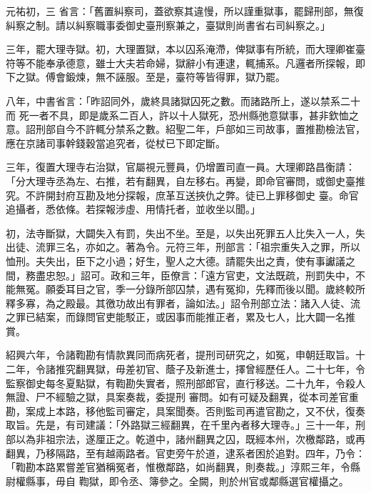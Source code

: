 \begin{pinyinscope}
 元祐初，三
 省言：「舊置糾察司，蓋欲察其違慢，所以謹重獄事，罷歸刑部，無復糾察之制。請以糾察職事委御史臺刑察兼之，臺獄則尚書省右司糾察之。」



 三年，罷大理寺獄。初，大理置獄，本以囚系淹滯，俾獄事有所統，而大理卿崔臺符等不能奉承德意，雖士大夫若命婦，獄辭小有連逮，輒捕系。凡邏者所探報，即下之獄。傅會鍛煉，無不誣服。至是，臺符等皆得罪，獄乃罷。



 八年，中書省言：「昨詔同外，歲終具諸獄囚死之數。而諸路所上，遂以禁系二十而
 死一者不具，即是歲系二百人，許以十人獄死，恐州縣弛意獄事，甚非欽恤之意。詔刑部自今不許輒分禁系之數。紹聖二年，戶部如三司故事，置推勘檢法官，應在京諸司事幹錢穀當追究者，從杖已下即定斷。



 三年，復置大理寺右治獄，官屬視元豐員，仍增置司直一員。大理卿路昌衡請：「分大理寺丞為左、右推，若有翻異，自左移右。再變，即命官審問，或御史臺推究。不許開封府互勘及地分探報，庶革互送挾仇之弊。徒已上罪移御史
 臺。命官追攝者，悉依條。若探報涉虛、用情托者，並收坐以聞。」



 初，法寺斷獄，大闢失入有罰，失出不坐。至是，以失出死罪五人比失入一人，失出徒、流罪三名，亦如之。著為令。元符三年，刑部言：「祖宗重失入之罪，所以恤刑。夫失出，臣下之小過；好生，聖人之大德。請罷失出之責，使有事讞議之間，務盡忠恕。」詔可。政和三年，臣僚言：「遠方官吏，文法既疏，刑罰失中，不能無冤。願委耳目之官，季一分錄所部囚禁，遇有冤抑，先釋而後以聞。歲終較所
 釋多寡，為之殿最。其徼功故出有罪者，論如法。」詔令刑部立法：諸入人徒、流之罪已結案，而錄問官吏能駁正，或因事而能推正者，累及七人，比大闢一名推賞。



 紹興六年，令諸鞫勘有情款異同而病死者，提刑司研究之，如冤，申朝廷取旨。十二年，令諸推究翻異獄，毋差初官、蔭子及新進士，擇曾經歷任人。二十七年，令監察御史每冬夏點獄，有鞫勘失實者，照刑部郎官，直行移送。二十九年，令殺人無證、尸不經驗之獄，具案奏裁，委提刑
 審問。如有可疑及翻異，從本司差官重勘，案成上本路，移他監司審定，具案聞奏。否則監司再遣官勘之，又不伏，復奏取旨。先是，有司建議：「外路獄三經翻異，在千里內者移大理寺。」三十一年，刑部以為非祖宗法，遂厘正之。乾道中，諸州翻異之囚，既經本州，次檄鄰路，或再翻異，乃移隔路，至有越兩路者。官吏旁午於道，逮系者困於追對。四年，乃令：「鞫勘本路累嘗差官猶稱冤者，惟檄鄰路，如尚翻異，則奏裁。」淳熙三年，令縣尉權縣事，毋自
 鞫獄，即令丞、簿參之。全闕，則於州官或鄰縣選官權攝之。




\end{pinyinscope}
